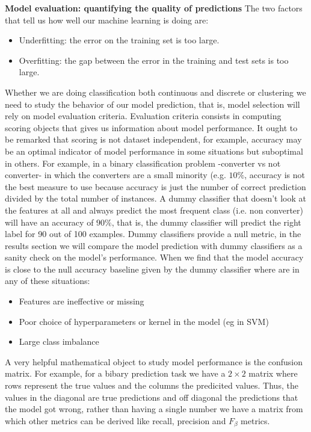 \documentclass[11pt]{article}
\begin{document}
\textbf{Model evaluation: quantifying the quality of predictions }
The two factors that tell us how well our machine learning is doing are:
\begin{itemize}
\item Underfitting: the error on the training set is too large.
\item Overfitting: the gap between the error in the training and test sets is too large. 
\end{itemize}

Whether we are doing classification both continuous and discrete or clustering we need to study the behavior of our model prediction, that is, model selection will rely on model evaluation criteria. Evaluation criteria consists in computing scoring objects that gives us information about model performance. It ought to be remarked that scoring is not dataset independent, for example, accuracy may be an optimal indicator of model performance in some situations but suboptimal in others. For example, in a binary classification problem -converter vs not converter- in which the converters are a small minority (e.g. $10\%$, accuracy is not the best measure to use because accuracy is just the number of correct prediction divided by the total number of instances. A dummy classifier that doesn't look at the features at all and always predict the most frequent class (i.e. non converter) will have an accuracy of $90\%$, that is, the dummy classifier will predict the right label for 90 out of 100 examples.
Dummy classifiers provide a null metric, in the results section we will compare the model prediction with dummy classifiers as a sanity check on the model's performance.
When we find that the model accuracy is close to the null accuracy baseline given by the dummy classifier where are in any of these situations:
\begin{itemize}
	\item Features are ineffective or missing
	\item Poor choice of hyperparameters or kernel in the model (eg in SVM) 
	\item Large class imbalance 
\end{itemize}
 A very helpful mathematical object to study model performance is the confusion matrix. For example, for a bibary prediction task we have a $2 \times 2$ matrix where rows represent the true values and the columns the predicited values. Thus, the values in the diagonal are true predictions and off diagonal the predictions that the model got wrong, rather  than having a single number we have a matrix from which other metrics can be derived like recall, precision and $F_\beta$ metrics.
\end{document}
